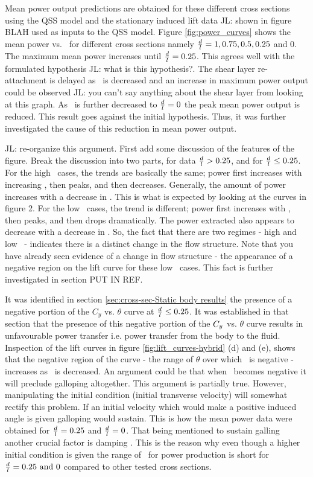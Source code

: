  
 
 Mean power output predictions are obtained for these different cross sections using the QSS model and the stationary induced lift data JL: shown in figure BLAH used as inputs to the QSS model. Figure \ref{fig:power_curves} shows the mean power vs. \massdamp\ for different cross sections namely $\frac{d}{l}=1,0.75,0.5,0.25$ and $0$. The maximum mean power increases until $\frac{d}{l}=0.25$. This agrees well with the formulated hypothesis JL: what is this hypothesis?. The shear layer re-attachment is delayed as \ratio\ is decreased and an increase in maximum power output could be observed JL: you can't say anything about the shear layer from looking at this graph. As \ratio\ is further decreased to $\frac{d}{l}=0$ the peak mean power output is reduced. This result goes against the initial hypothesis. Thus, it was further investigated the cause of this reduction in mean power output. 

JL: re-organize this argument. First add some discussion of the features of the figure. Break the discussion into two parts, for data $\frac{d}{l} > 0.25$, and for $\frac{d}{l} \leq 0.25$. For the high \ratio\ cases, the trends are basically the same; power first increases with increasing \massdamp, then peaks, and then decreases. Generally, the amount of power increases with a decrease in \ratio. This is what is expected by looking at the curves in figure 2. For the low \ratio\ cases, the trend is different; power first increases with \massdamp, then peaks, and then drops dramatically. The power extracted also appears to decrease with a decrease in \ratio. So, the fact that there are two regimes - high and low \ratio\ - indicates there is a distinct change in the flow structure. Note that you have already seen evidence of a change in flow structure - the appearance of a negative region on the lift curve for these low \ratio\ cases. This fact is further investigated in section PUT IN REF.
 
It was identified in section \ref{sec:cross-sec-Static body results} the presence of a negative portion of the $C_y$ vs. $\theta$ curve at $\frac{d}{l}\leq0.25$. It was established in that section that the presence of this negative portion of the $C_{y}$ vs. $\theta$ curve results in unfavourable power transfer i.e. power transfer from the body to the fluid. Inspection of the lift curves in figure \ref{fig:lift_curves-hybrid} (d) and (e), shows that the negative region of the curve - the range of $\theta$ over which \cy\ is negative - increases as \ratio\ is decreased. An argument could be that when \cy\ becomes negative it will preclude galloping altogether. This argument is partially true. However, manipulating the initial condition (initial transverse velocity) will somewhat rectify this problem. If an initial velocity which would make a positive induced angle is given galloping would sustain. This is how the mean power data were obtained for $\frac{d}{l}=0.25$ and $\frac{d}{l}=0$. That being mentioned to sustain galling another crucial factor is damping \citet{Paidoussis2010}. This is the reason why even though a higher initial condition is given the range of \massdamp\ for power production is short for $\ratio=0.25\ \text{and}\ 0$ compared to other tested cross sections. 

